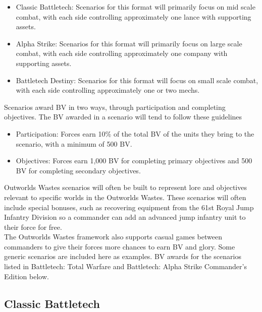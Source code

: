 \documentclass[UTF8]{article}
\begin{document}
\begin{itemize}

\item Classic Battletech: Scenarios for this format will primarily focus on mid scale combat, with each side controlling approximately one lance with supporting assets.

\item Alpha Strike: Scenarios for this format will primarily focus on large scale combat, with each side controlling approximately one company with supporting assets.

\item Battletech Destiny: Scenarios for this format will focus on small scale combat, with each side controlling approximately one or two mechs.

\end{itemize}

Scenarios award BV in two ways, through participation and completing objectives.
The BV awarded in a scenario will tend to follow these guidelines

\begin{itemize}

\item Participation: Forces earn 10\% of the total BV of the units they bring to the scenario, with a minimum of 500 BV.

\item Objectives: Forces earn 1,000 BV for completing primary objectives and 500 BV for completing secondary objectives.

\end{itemize}

Outworlds Wastes scenarios will often be built to represent lore and objectives relevant to specific worlds in the Outworlds Wastes.
These scenarios will often include special bonuses, such as recovering equipment from the 61st Royal Jump Infantry Division so a commander can add an advanced jump infantry unit to their force for free.\\

The Outworlds Wastes framework also supports casual games between commanders to give their forces more chances to earn BV and glory.
Some generic scenarios are included here as examples.
BV awards for the scenarios listed in Battletech: Total Warfare and Battletech: Alpha Strike Commander's Edition below.

\subsection{Classic Battletech}
\end{document}
